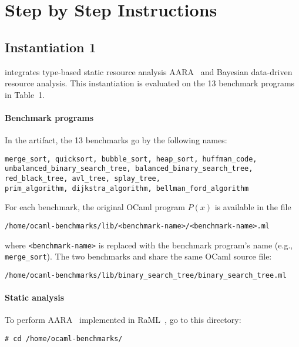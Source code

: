 
\section{Step by Step Instructions}
\label{sec:step-by-step-instructions}

\subsection{Instantiation 1}
\label{sec:step-by-step-instructions:instantiation-1}

 integrates type-based static resource
analysis AARA~\citep{Hofmann2003,Hoffmann2011a,Hoffmann2022} and Bayesian data-driven
resource analysis.
%
This instantiation is evaluated on the 13 benchmark programs in Table~1.

\paragraph{Benchmark programs}

In the artifact, the 13 benchmarks go by the following names:
\begin{verbatim}
merge_sort, quicksort, bubble_sort, heap_sort, huffman_code,
unbalanced_binary_search_tree, balanced_binary_search_tree,
red_black_tree, avl_tree, splay_tree,
prim_algorithm, dijkstra_algorithm, bellman_ford_algorithm
\end{verbatim}
%
For each benchmark, the original OCaml program $P(x)$ is available in the file
\begin{verbatim}
/home/ocaml-benchmarks/lib/<benchmark-name>/<benchmark-name>.ml
\end{verbatim}
where \texttt{<benchmark-name>} is replaced with the benchmark program's name
(e.g., \texttt{merge\_sort}).
%
The two benchmarks \unbalancedbst{} and \balancedbst{} share the same OCaml
source file:
\begin{verbatim}
/home/ocaml-benchmarks/lib/binary_search_tree/binary_search_tree.ml
\end{verbatim}

\paragraph{Static analysis}

To perform AARA~\citep{Hofmann2003,Hoffmann2011a,Hoffmann2022} implemented in
RaML~\citep{RaML,Hoffmann2017}, go to this directory:
\begin{verbatim}
# cd /home/ocaml-benchmarks/
\end{verbatim}


